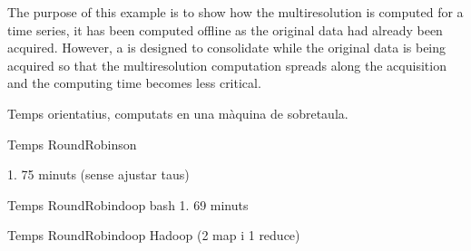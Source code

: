   The purpose
of this example is to show how the multiresolution is computed for a
time series, it has been computed offline as the original data had
already been acquired. However, a  is designed to
consolidate while the original data is being acquired so that the
multiresolution computation spreads along the acquisition and the
computing time becomes less critical.



Temps orientatius, computats en una màquina de sobretaula. 

Temps RoundRobinson

1. 75 minuts (sense ajustar taus)


Temps RoundRobindoop bash
1. 69 minuts


Temps RoundRobindoop Hadoop
  (2 map i 1 reduce)





